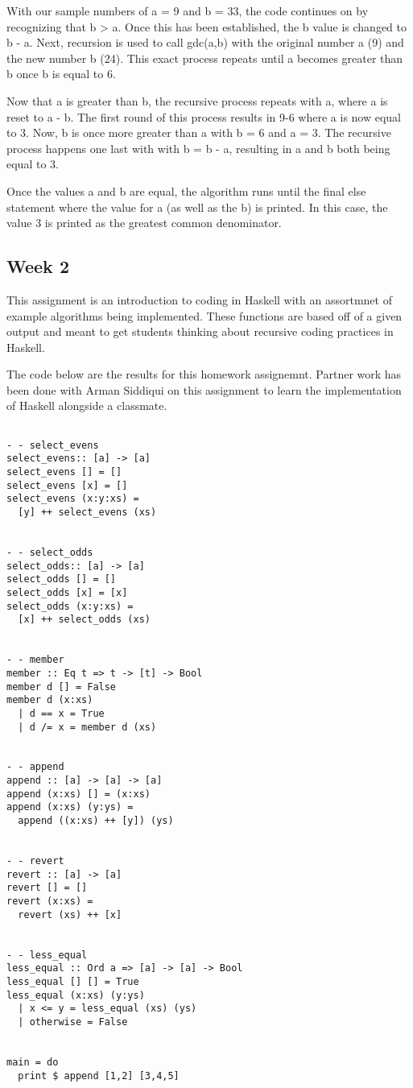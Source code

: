 \documentclass{article}
\theoremstyle{theorem}
\theoremstyle{definition}
\theoremstyle{remark}
\begin{document}
\medskip\noindent
With our sample numbers of a = 9 and b = 33, the code continues on by recognizing that b > a. Once this has been established, the b value is changed to b - a.
Next, recursion is used to call gdc(a,b) with the original number a (9) and the new number b (24).
This exact process repeats until a becomes greater than b once b is equal to 6.

\medskip\noindent
Now that a is greater than b, the recursive process repeats with a, where a is reset to a - b.
The first round of this process results in 9-6 where a is now equal to 3.
Now, b is once more greater than a with b = 6 and a = 3.
The recursive process happens one last with with b = b - a, resulting in a and b both being equal to 3.


\medskip\noindent
Once the values a and b are equal, the algorithm runs until the final else statement where the value for a (as well as the b) is printed.
In this case, the value 3 is printed as the greatest common denominator.

\subsection{Week 2}
This assignment is an introduction to coding in Haskell with an assortmnet of example algorithms being implemented. These functions are based off of a given output and meant to get students thinking about recursive coding practices in Haskell.

\medskip\noindent
The code below are the results for this homework assignemnt. Partner work has been done with Arman Siddiqui on this assignment to learn the implementation of Haskell alongside a classmate.

\begin{lstlisting}

- - select_evens
select_evens:: [a] -> [a]
select_evens [] = []
select_evens [x] = []
select_evens (x:y:xs) =
  [y] ++ select_evens (xs)


- - select_odds
select_odds:: [a] -> [a]
select_odds [] = []
select_odds [x] = [x]
select_odds (x:y:xs) =
  [x] ++ select_odds (xs)


- - member
member :: Eq t => t -> [t] -> Bool
member d [] = False
member d (x:xs)
  | d == x = True
  | d /= x = member d (xs)


- - append
append :: [a] -> [a] -> [a]
append (x:xs) [] = (x:xs)
append (x:xs) (y:ys) =
  append ((x:xs) ++ [y]) (ys)


- - revert
revert :: [a] -> [a]
revert [] = []
revert (x:xs) =
  revert (xs) ++ [x]


- - less_equal
less_equal :: Ord a => [a] -> [a] -> Bool
less_equal [] [] = True
less_equal (x:xs) (y:ys)
  | x <= y = less_equal (xs) (ys)
  | otherwise = False


main = do
  print $ append [1,2] [3,4,5]

\end{lstlisting}
\end{document}
